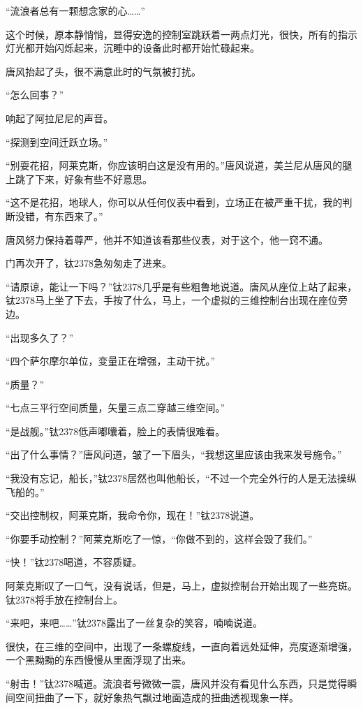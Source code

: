 “流浪者总有一颗想念家的心……” 

这个时候，原本静悄悄，显得安逸的控制室跳跃着一两点灯光，很快，所有的指示灯光都开始闪烁起来，沉睡中的设备此时都开始忙碌起来。 

唐风抬起了头，很不满意此时的气氛被打扰。 

“怎么回事？” 

响起了阿拉尼尼的声音。 

“探测到空间迁跃立场。” 

“别耍花招，阿莱克斯，你应该明白这是没有用的。”唐风说道，美兰尼从唐风的腿上跳了下来，好象有些不好意思。 

“这不是花招，地球人，你可以从任何仪表中看到，立场正在被严重干扰，我的判断没错，有东西来了。” 

唐风努力保持着尊严，他并不知道该看那些仪表，对于这个，他一窍不通。 

门再次开了，钛2378急匆匆走了进来。 

“请原谅，能让一下吗？”钛2378几乎是有些粗鲁地说道。唐风从座位上站了起来，钛2378马上坐了下去，手按了什么，马上，一个虚拟的三维控制台出现在座位旁边。 

“出现多久了？” 

“四个萨尔摩尔单位，变量正在增强，主动干扰。” 

“质量？” 

“七点三平行空间质量，矢量三点二穿越三维空间。” 

“是战舰。”钛2378低声嘟囔着，脸上的表情很难看。 

“出了什么事情？”唐风问道，皱了一下眉头，“我想这里应该由我来发号施令。” 

“我没有忘记，船长，”钛2378居然也叫他船长，“不过一个完全外行的人是无法操纵飞船的。” 

“交出控制权，阿莱克斯，我命令你，现在！”钛2378说道。 

“你要手动控制？”阿莱克斯吃了一惊，“你做不到的，这样会毁了我们。” 

“快！”钛2378喝道，不容质疑。 

阿莱克斯叹了一口气，没有说话，但是，马上，虚拟控制台开始出现了一些亮斑。钛2378将手放在控制台上。 

“来吧，来吧……”钛2378露出了一丝复杂的笑容，喃喃说道。 

很快，在三维的空间中，出现了一条螺旋线，一直向着远处延伸，亮度逐渐增强，一个黑黝黝的东西慢慢从里面浮现了出来。 

“射击！”钛2378喊道。流浪者号微微一震，唐风并没有看见什么东西，只是觉得瞬间空间扭曲了一下，就好象热气飘过地面造成的扭曲透视现象一样。 

